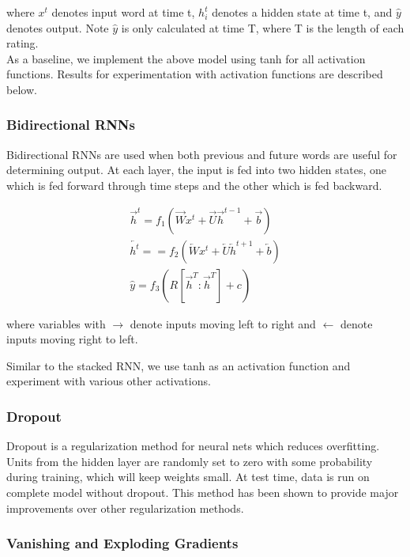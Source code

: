 \documentclass{article} %
\begin{document}
where $x^t$ denotes input word at time t, $h_i^t$ denotes a hidden state at time
t, and $\hat{y}$ denotes output. Note $\hat{y}$ is only calculated at time T,
where T is the length of each rating. \\

As a baseline, we implement the above model using tanh for all activation
functions. Results for experimentation with activation functions are described
below.

\subsubsection{Bidirectional RNNs}

Bidirectional RNNs are used when both previous and future words are useful for
determining output. At each layer, the input is fed into two hidden states, one
which is fed forward through time steps and the other which is fed backward.

\begin{gather}
\overrightarrow{h}^t = 
f_1(\overrightarrow{W} x^t + 
\overrightarrow{U} \overrightarrow{h}^{t-1} + 
\overrightarrow{b}) \\
\overleftarrow{h^t} = 
= f_2(\overleftarrow{W} x^t + 
\overleftarrow{U} \overleftarrow{h}^{t+1} + 
\overleftarrow{b}) \\ 
\hat{y} = 
f_3(R[\overrightarrow{h}^T:\overrightarrow{h}^T] + c)
\end{gather}

where variables with $\rightarrow$ denote inputs moving left to right and
$\leftarrow$ denote inputs moving right to left.

Similar to the stacked RNN, we use tanh as an activation function and experiment
with various other activations.

\subsubsection{Dropout}

Dropout is a regularization method for neural nets which reduces overfitting.
Units from the hidden layer are randomly set to zero with some probability
during training, which will keep weights small. At test time, data is run on
complete model without dropout. This method has been shown to provide major
improvements over other regularization methods.

\subsubsection{Vanishing and Exploding Gradients}
\end{document}
